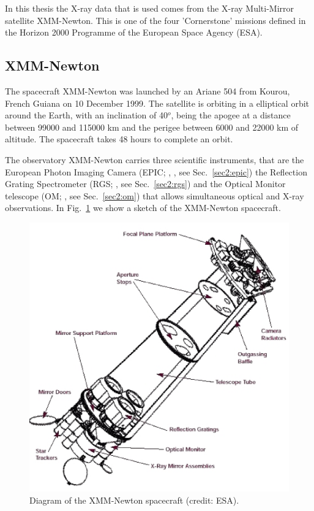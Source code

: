 In this thesis the X-ray data that is used comes from the X-ray Multi-Mirror satellite XMM-Newton. This is one of the four 'Cornerstone' missions defined in the Horizon 2000 Programme of the European Space Agency (ESA). 






\subsection{XMM-Newton}
\label{sec2:xmm}

The spacecraft XMM-Newton was launched by an Ariane 504 from Kourou, French Guiana on 10 December 1999. The satellite is orbiting in a elliptical orbit around the Earth, with an inclination of 40$^{o}$, being the apogee at a distance between 99000 and 115000 km and the perigee between 6000 and 22000 km of altitude. The spacecraft takes 48 hours to complete an orbit.

The observatory XMM-Newton carries three scientific instruments, that are the European Photon Imaging Camera (EPIC;  \citealt{turner01}, \citealt{struder01}, see Sec.~\ref{sec2:epic}) the Reflection Grating Spectrometer (RGS; \citealt{denherder01}, see Sec.~\ref{sec2:rgs}) and the Optical Monitor telescope (OM; \citealt{mason01}, see Sec.~\ref{sec2:om}) that allows simultaneous optical and X-ray observations. In Fig.~\ref{sec2:xmmsch} we show a sketch of the XMM-Newton spacecraft.

 \begin{figure}
 \centering
 \includegraphics[width=\textwidth]{Chapter2_data/xmm.ps}
    \caption{Diagram of the XMM-Newton spacecraft (credit: ESA).}
 \label{sec2:xmmsch}
 \end{figure}
 

